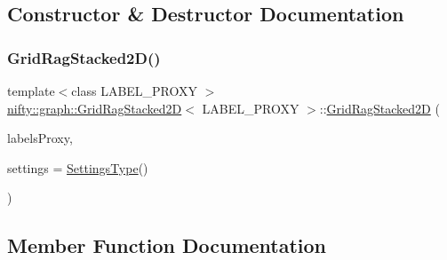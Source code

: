 \subsection{Constructor \& Destructor Documentation}
\mbox{\label{classnifty_1_1graph_1_1GridRagStacked2D_a7dda5d4d4c9d873a6a52ae28b0bea026}} 
\subsubsection{\texorpdfstring{Grid\+Rag\+Stacked2\+D()}{GridRagStacked2D()}}
{\footnotesize\ttfamily template$<$class L\+A\+B\+E\+L\+\_\+\+P\+R\+O\+XY $>$ \\
\hyperlink{classnifty_1_1graph_1_1GridRagStacked2D}{nifty\+::graph\+::\+Grid\+Rag\+Stacked2D}$<$ L\+A\+B\+E\+L\+\_\+\+P\+R\+O\+XY $>$\+::\hyperlink{classnifty_1_1graph_1_1GridRagStacked2D}{Grid\+Rag\+Stacked2D} (\begin{DoxyParamCaption}\item[{const \hyperlink{classnifty_1_1graph_1_1GridRagStacked2D_a09b44c819b97274a1025dc68cb6b3dc9}{Labels\+Proxy} \&}]{labels\+Proxy,  }\item[{const \hyperlink{classnifty_1_1graph_1_1GridRagStacked2D_abc778dc9bd7c20bacba215c1fc64ffb5}{Settings\+Type} \&}]{settings = {\ttfamily \hyperlink{classnifty_1_1graph_1_1GridRagStacked2D_abc778dc9bd7c20bacba215c1fc64ffb5}{Settings\+Type}()} }\end{DoxyParamCaption})\hspace{0.3cm}{\ttfamily [inline]}}



\subsection{Member Function Documentation}
\mbox{\label{classnifty_1_1graph_1_1GridRagStacked2D_acd82539263485e14536c46e6466d8d99}} 
